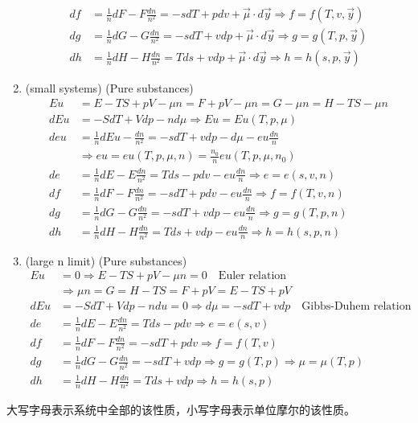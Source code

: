 \begin{thm}
\begin{enumerate}
\begin{align*}
        df &= \frac{1}{n} dF - F \frac{dn}{n^2} = -s dT + p dv + \vec{\mu} \cdot d\vec{y}  \Rightarrow f = f(T, v, \vec{y}) \\
        dg &= \frac{1}{n} dG - G \frac{dn}{n^2} = -s dT + v dp + \vec{\mu} \cdot d\vec{y}  \Rightarrow g = g(T, p, \vec{y}) \\
        dh &= \frac{1}{n} dH - H \frac{dn}{n^2} = T ds + v dp + \vec{\mu} \cdot d\vec{y}  \Rightarrow h = h(s, p, \vec{y})
        \end{align*}
        \item (small systems) (Pure substances)
        \begin{align*}
            Eu &= E - TS + pV - \mu n = F + pV - \mu n = G - \mu n = H - TS - \mu n \\
dEu &= -S dT + V dp - n d\mu \Rightarrow Eu = Eu(T, p, \mu) \\
deu &= \frac{1}{n} dEu - \frac{dn}{n^2} = -s dT + v dp - d\mu - eu \frac{dn}{n} \\
&\Rightarrow eu = eu(T, p, \mu, n) = \frac{n_0}{n} eu(T, p, \mu, n_0) \\
de &= \frac{1}{n} dE - E \frac{dn}{n^2} = T ds - p dv - eu \frac{dn}{n} \Rightarrow e = e(s, v, n) \\
df &= \frac{1}{n} dF - F \frac{dn}{n^2} = -s dT + p dv - eu \frac{dn}{n} \Rightarrow f = f(T, v, n) \\
dg &= \frac{1}{n} dG - G \frac{dn}{n^2} = -s dT + v dp - eu \frac{dn}{n} \Rightarrow g = g(T, p, n) \\
dh &= \frac{1}{n} dH - H \frac{dn}{n^2} = T ds + v dp - eu \frac{dn}{n} \Rightarrow h = h(s, p, n)
\end{align*}
        \item (large n limit) (Pure substances)
        \begin{align*}
        Eu &= 0  \Rightarrow E - TS + pV - \mu n = 0 \quad \boxed{\text{Euler relation}}\\
        &\Rightarrow \mu n = G = H - TS = F + pV = E - TS + pV \\
dEu &= -S dT + Vdp - n du = 0  \Rightarrow d\mu = -s dT + vdp \quad \boxed{\text{Gibbs-Duhem relation}} \\
        de &= \frac{1}{n} dE - E \frac{dn}{n^2} = T ds - p dv  \Rightarrow e = e(s, v) \\
        df &= \frac{1}{n} dF - F \frac{dn}{n^2} = -s dT + p dv  \Rightarrow f = f(T, v) \\
        dg &= \frac{1}{n} dG - G \frac{dn}{n^2} = -s dT + v dp  \Rightarrow g = g(T, p) \Rightarrow \mu =\mu (T,p) \\
        dh &= \frac{1}{n} dH - H \frac{dn}{n^2} = T ds + v dp  \Rightarrow h = h(s, p)
        \end{align*}
    \end{enumerate}
    \begin{zhu}
    大写字母表示系统中全部的该性质，小写字母表示单位摩尔的该性质。
    \end{zhu}
\end{thm}
